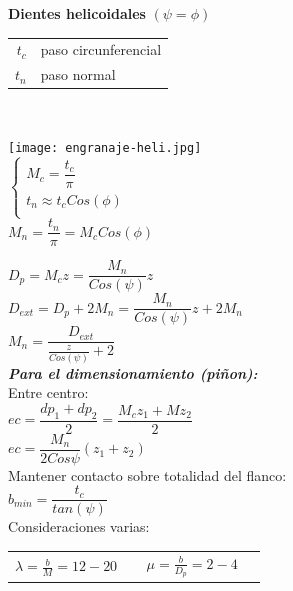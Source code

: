\documentclass[11pt,a4paper]{article}
\begin{document}
\begin{multicols}{2}

	\textbf{Dientes helicoidales} $(\psi=\phi)$\\
	\begin{tabular}{r l}
		$t_c$& paso circunferencial\\
		$t_n$& paso normal\\
	\end{tabular}\\



		\begin{multicols}{2}
			\texttt{[image: engranaje-heli.jpg]}\\
			$\left\{\begin{array}{l}
				M_c=\dfrac{t_c}{\pi}\\
				t_n\approx t_c Cos(\phi)\\
			\end{array} \right.$\\
			$M_n=\dfrac{t_n}{\pi}=M_c Cos(\phi)$\\
		\end{multicols}
		

	$D_p=M_c z= \dfrac{M_n}{Cos(\psi)}z$\\
	$D_{ext}=D_p+2M_n =\dfrac{M_n}{Cos(\psi)}z+2M_n$\\
	$M_n=\dfrac{D_{ext}}{\frac{z}{Cos(\psi)}+2}$\\\vspace*{0.2cm}
	\textbf{\textit{Para el dimensionamiento (piñon):}}\\
	\textbullet Entre centro:\\\vspace*{0.2cm}
	$ec=\dfrac{dp_1+dp_2}{2}=\dfrac{M_c z_1+ M z_2}{2}$\\
	$ec=\dfrac{M_n}{2 Cos{\psi}}(z_1+z_2)$\\
	\textbullet Mantener contacto sobre totalidad del flanco:\\
	$b_{min}=\dfrac{t_c}{tan(\psi)}$\\
	Consideraciones varias:\\
	\begin{tabular}{l r}
	$\lambda=\frac{b}{M}= 12 - 20~~~~~$&
	$\mu=\frac{b}{D_p}=2 - 4~~~~~$\\
	\end{tabular}


\end{multicols}
\end{document}
